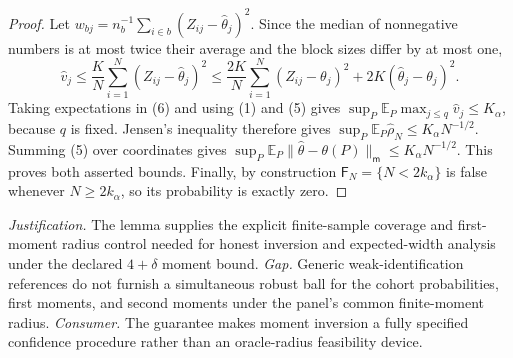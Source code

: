 \documentclass{article}
\begin{document}
\begin{proof}
Let \(w_{bj}=n_b^{-1}\sum_{i\in b}(Z_{ij}-\widehat\theta_j)^2\). Since the median of nonnegative numbers is at most twice their average and the block sizes differ by at most one,
\[
\widehat v_j\leq \frac K N\sum_{i=1}^N(Z_{ij}-\widehat\theta_j)^2
\leq \frac{2K}{N}\sum_{i=1}^N(Z_{ij}-\theta_j)^2+2K(\widehat\theta_j-\theta_j)^2. \tag{6}
\]
Taking expectations in (6) and using (1) and (5) gives \(\sup_P\mathbb E_P\max_{j\leq q}\widehat v_j\leq K_\alpha\), because \(q\) is fixed. Jensen's inequality therefore gives \(\sup_P\mathbb E_P\widehat\rho_N\leq K_\alpha N^{-1/2}\). Summing (5) over coordinates gives \(\sup_P\mathbb E_P\|\widehat\theta-\theta(P)\|_{\mathsf m}\leq K_\alpha N^{-1/2}\). This proves both asserted bounds. Finally, by construction \(\mathsf F_N=\{N<2k_\alpha\}\) is false whenever \(N\geq2k_\alpha\), so its probability is exactly zero.
\end{proof}
\par\smallskip\noindent \textit{Justification.} The lemma supplies the explicit finite-sample coverage and first-moment radius control needed for honest inversion and expected-width analysis under the declared \(4+\delta\) moment bound. \textit{Gap.} Generic weak-identification references do not furnish a simultaneous robust ball for the cohort probabilities, first moments, and second moments under the panel's common finite-moment radius. \textit{Consumer.} The guarantee makes moment inversion a fully specified confidence procedure rather than an oracle-radius feasibility device.
\end{document}
